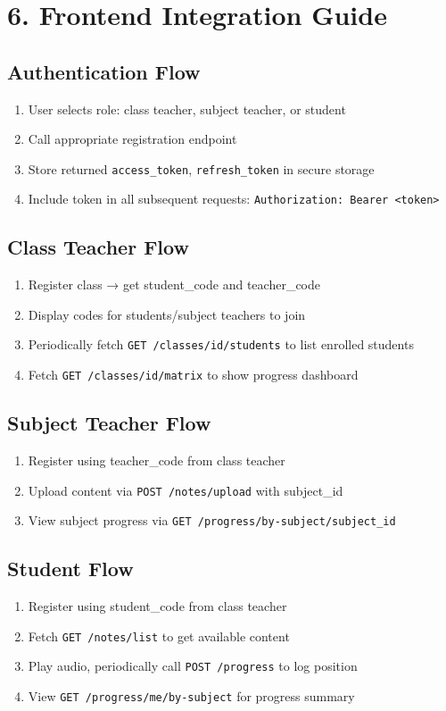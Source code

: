 \documentclass[11pt,a4paper]{article}
\begin{document}
\section*{6. Frontend Integration Guide}

\subsection*{Authentication Flow}
\begin{enumerate}
    \item User selects role: class teacher, subject teacher, or student
    \item Call appropriate registration endpoint
    \item Store returned \texttt{access\_token}, \texttt{refresh\_token} in secure storage
    \item Include token in all subsequent requests: \texttt{Authorization: Bearer <token>}
\end{enumerate}

\subsection*{Class Teacher Flow}
\begin{enumerate}
    \item Register class → get student\_code and teacher\_code
    \item Display codes for students/subject teachers to join
    \item Periodically fetch \texttt{GET /classes/{id}/students} to list enrolled students
    \item Fetch \texttt{GET /classes/{id}/matrix} to show progress dashboard
\end{enumerate}

\subsection*{Subject Teacher Flow}
\begin{enumerate}
    \item Register using teacher\_code from class teacher
    \item Upload content via \texttt{POST /notes/upload} with subject\_id
    \item View subject progress via \texttt{GET /progress/by-subject/{subject\_id}}
\end{enumerate}

\subsection*{Student Flow}
\begin{enumerate}
    \item Register using student\_code from class teacher
    \item Fetch \texttt{GET /notes/list} to get available content
    \item Play audio, periodically call \texttt{POST /progress} to log position
    \item View \texttt{GET /progress/me/by-subject} for progress summary
\end{enumerate}
\end{document}
